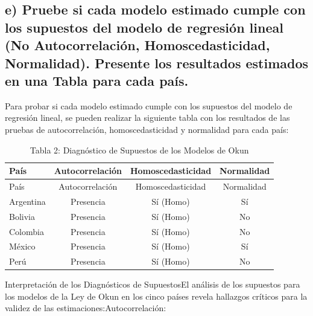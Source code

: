 \documentclass[
  11pt,
  letterpaper,
  DIV=11,
  numbers=noendperiod]{scrartcl}
\begin{document}
\subsection{e) Pruebe si cada modelo estimado cumple con los supuestos
del modelo de regresión lineal (No Autocorrelación, Homoscedasticidad,
Normalidad). Presente los resultados estimados en una Tabla para cada
país.}\label{e-pruebe-si-cada-modelo-estimado-cumple-con-los-supuestos-del-modelo-de-regresiuxf3n-lineal-no-autocorrelaciuxf3n-homoscedasticidad-normalidad.-presente-los-resultados-estimados-en-una-tabla-para-cada-pauxeds.}

Para probar si cada modelo estimado cumple con los supuestos del modelo
de regresión lineal, se pueden realizar la siguiente tabla con los
resultados de las pruebas de autocorrelación, homoscedasticidad y
normalidad para cada país:

\begin{longtable}[]{@{}lccc@{}}
\caption{Tabla 2: Diagnóstico de Supuestos de los Modelos de
Okun}\tabularnewline
\toprule\noalign{}
País & Autocorrelación & Homoscedasticidad & Normalidad \\
\midrule\noalign{}
\endfirsthead
\toprule\noalign{}
País & Autocorrelación & Homoscedasticidad & Normalidad \\
\midrule\noalign{}
\endhead
\bottomrule\noalign{}
\endlastfoot
Argentina & Presencia & Sí (Homo) & Sí \\
Bolivia & Presencia & Sí (Homo) & No \\
Colombia & Presencia & Sí (Homo) & No \\
México & Presencia & Sí (Homo) & Sí \\
Perú & Presencia & Sí (Homo) & No \\
\end{longtable}

Interpretación de los Diagnósticos de SupuestosEl análisis de los
supuestos para los modelos de la Ley de Okun en los cinco países revela
hallazgos críticos para la validez de las estimaciones:Autocorrelación:
\end{document}
